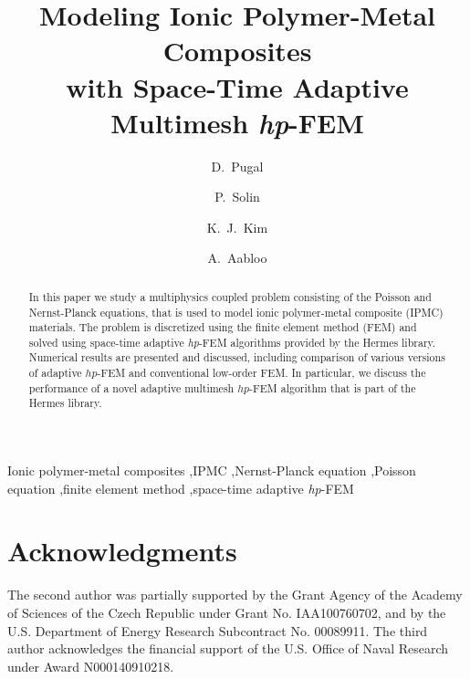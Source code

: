 \documentclass[letterpaper,3p]{elsarticle}
\begin{document}
\begin{frontmatter}

\title{Modeling Ionic Polymer-Metal Composites\\ with Space-Time Adaptive Multimesh \emph{hp}-FEM}

\author[unrme,tartu]{D.~Pugal}

\author[unrmath,czech]{P.~Solin}

\author[unrme]{K.~J.~Kim}

\author[tartu]{A.~Aabloo}

\address[unrme]{Mechanical Engineering Department, University of Nevada, Reno, NV, U.S.A.}
\address[unrmath]{Department of Mathematics and Statistics,
University of Nevada, Reno, NV, U.S.A.}
\address[czech]{Institute of Thermomechanics, Prague, Czech Republic}
\address[tartu]{Institute of Technology, Tartu University, Estonia}


\begin{abstract}
In this paper we study a multiphysics coupled problem consisting 
of the Poisson and Nernst-Planck equations, that is used to 
model ionic polymer-metal composite (IPMC) materials. 
The problem is discretized using the finite element method (FEM) and solved using 
space-time adaptive \emph{hp}-FEM algorithms provided by the Hermes 
library. Numerical results are presented and discussed, including 
comparison of various versions of adaptive $hp$-FEM and conventional 
low-order FEM. In particular, we discuss the performance of a novel
adaptive multimesh $hp$-FEM algorithm that is part of the Hermes
library.
\end{abstract}

\begin{keyword}
  Ionic polymer-metal composites \sep IPMC \sep Nernst-Planck equation \sep Poisson equation 
  \sep finite element method \sep space-time adaptive \emph{hp}-FEM 
\end{keyword}

\end{frontmatter}







\section*{Acknowledgments}
The second author was partially supported by the Grant Agency of the Academy of 
Sciences of the Czech Republic under Grant No. IAA100760702, and by the U.S.
Department of Energy Research Subcontract No. 00089911. 
The third author acknowledges the financial support of the U.S. Office of Naval Research 
under Award N000140910218.


\end{document}
